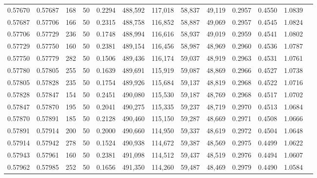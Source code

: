 \begin{tabular}{rrrrrrrrrrrrr}
0.57670 & 0.57687 &   168 &  50 &                                     0.2294 & 488,592 & 117,018 &  58,837 &  49,119 & 0.2957 & 0.4550 & 1.0839 \\
0.57687 & 0.57706 &   166 &  50 &                                     0.2315 & 488,758 & 116,852 &  58,887 &  49,069 & 0.2957 & 0.4545 & 1.0824 \\
0.57706 & 0.57729 &   236 &  50 &                                     0.1748 & 488,994 & 116,616 &  58,937 &  49,019 & 0.2959 & 0.4541 & 1.0802 \\
0.57729 & 0.57750 &   160 &  50 &                                     0.2381 & 489,154 & 116,456 &  58,987 &  48,969 & 0.2960 & 0.4536 & 1.0787 \\
0.57750 & 0.57779 &   282 &  50 &                                     0.1506 & 489,436 & 116,174 &  59,037 &  48,919 & 0.2963 & 0.4531 & 1.0761 \\
0.57780 & 0.57805 &   255 &  50 &                                     0.1639 & 489,691 & 115,919 &  59,087 &  48,869 & 0.2966 & 0.4527 & 1.0738 \\
0.57805 & 0.57828 &   235 &  50 &                                     0.1754 & 489,926 & 115,684 &  59,137 &  48,819 & 0.2968 & 0.4522 & 1.0716 \\
0.57828 & 0.57847 &   154 &  50 &                                     0.2451 & 490,080 & 115,530 &  59,187 &  48,769 & 0.2968 & 0.4517 & 1.0702 \\
0.57847 & 0.57870 &   195 &  50 &                                     0.2041 & 490,275 & 115,335 &  59,237 &  48,719 & 0.2970 & 0.4513 & 1.0684 \\
0.57870 & 0.57891 &   185 &  50 &                                     0.2128 & 490,460 & 115,150 &  59,287 &  48,669 & 0.2971 & 0.4508 & 1.0666 \\
0.57891 & 0.57914 &   200 &  50 &                                     0.2000 & 490,660 & 114,950 &  59,337 &  48,619 & 0.2972 & 0.4504 & 1.0648 \\
0.57914 & 0.57942 &   278 &  50 &                                     0.1524 & 490,938 & 114,672 &  59,387 &  48,569 & 0.2975 & 0.4499 & 1.0622 \\
0.57943 & 0.57961 &   160 &  50 &                                     0.2381 & 491,098 & 114,512 &  59,437 &  48,519 & 0.2976 & 0.4494 & 1.0607 \\
0.57962 & 0.57985 &   252 &  50 &                                     0.1656 & 491,350 & 114,260 &  59,487 &  48,469 & 0.2979 & 0.4490 & 1.0584 \\

\end{tabular}
